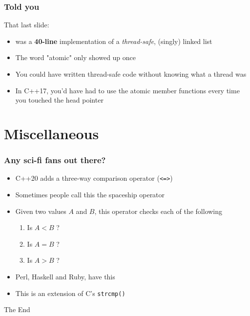 \documentclass{beamer}
\begin{document}
\begin{frame}
\frametitle{Told you}

That last slide:

\begin{itemize}
\setlength\itemsep{2em}
\item was a 
\textbf{40-line} implementation of a \emph{thread-safe}, (singly) linked list
\item The word "atomic" only showed up once
\item You could have written thread-safe code without knowing what a thread was
\item In C++17, you'd have had to use the atomic member functions every time you touched the head pointer
\end{itemize}

\end{frame}

\section{Miscellaneous}

\begin{frame}
\frametitle{Any sci-fi fans out there?}
\begin{itemize}
\setlength\itemsep{2em}
\item C++20 adds a three-way comparison operator (\texttt{<=>})
\item Sometimes people call this the spaceship operator
\item Given two values $A$ and $B$, this operator checks each of the following
\begin{enumerate}
\item Is $A < B$ ?
\item Is $A = B$ ?
\item Is $A > B$ ?
\end{enumerate}

\item Perl, Haskell and Ruby, have this

\item This is an extension of C's \texttt{strcmp()}
\end{itemize}
\end{frame}

\begin{frame}
\Huge{\centerline{The End}}
\end{frame}
\end{document}
